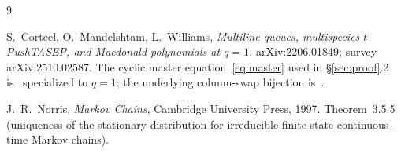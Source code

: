 \documentclass[12pt]{article}
\theoremstyle{definition}
\begin{document}
\begin{thebibliography}{9}

S.~Corteel, O.~Mandelshtam, L.~Williams,
\emph{Multiline queues, multispecies $t$-PushTASEP, and Macdonald
polynomials at $q=1$.}
arXiv:2206.01849; survey arXiv:2510.02587.
The cyclic master equation~\eqref{eq:master} used in
§\ref{sec:proof}.2 is~\cite[Theorem~5.4]{CMW} specialized to $q=1$;
the underlying column-swap bijection is~\cite[Proposition~5.2]{CMW}.

J.~R.~Norris, \emph{Markov Chains}, Cambridge University Press, 1997.
Theorem~3.5.5 (uniqueness of the stationary distribution for
irreducible finite-state continuous-time Markov chains).

\end{thebibliography}
\end{document}
